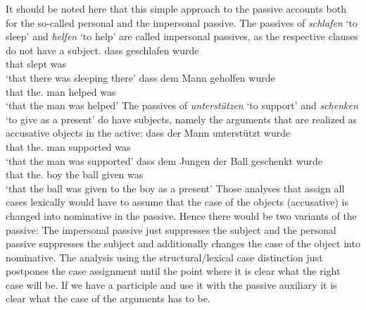 It should be noted here that this simple approach to the passive accounts both for the so-called
personal and the impersonal passive. The passives of \emph{schlafen} `to sleep' and \emph{helfen}
`to help' are called impersonal passives, as the respective clauses do not have a subject. 
\eal
\ex 
\gll dass geschlafen wurde\\
     that slept was\\
\glt `that there was sleeping there'
\ex
\gll dass dem Mann geholfen wurde\\
     that the.\DAT{} man helped was\\
\glt `that the man was helped'
\zl
The passives of \emph{unterstützen} `to support' and \emph{schenken} `to give as a present' do have
subjects, namely the arguments that are realized as accusative objects in the active:
\eal
\ex 
\gll dass der Mann unterstützt wurde\\
     that the.\NOM{} man supported was\\
\glt `that the man was supported'
\ex
\gll dass dem Jungen der Ball geschenkt wurde\\
     that the.\DAT{} boy the\NOM{} ball given was\\
\glt `that the ball was given to the boy as a present'
\zl
Those analyses that assign all cases lexically would have to assume that the case of the objects
(accusative) is changed into nominative in the passive. Hence there would be two variants of the
passive: The impersonal passive just suppresses the subject and the personal passive suppresses the
subject and additionally changes the case of the object into nominative. The analysis using the
structural/lexical case distinction just postpones the case assignment until the point where it is
clear what the right case will be. If we have a participle and use it with the passive auxiliary it
is clear what the case of the arguments has to be.





